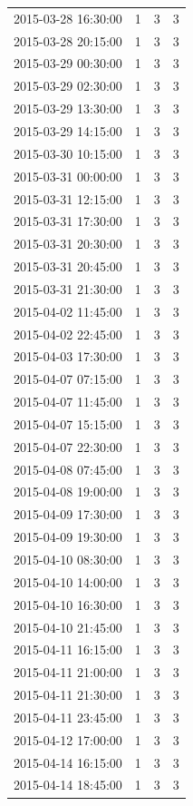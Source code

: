 \begin{tabular}{lrrr}
2015-03-28 16:30:00 & 1 & 3 & 3 \\
2015-03-28 20:15:00 & 1 & 3 & 3 \\
2015-03-29 00:30:00 & 1 & 3 & 3 \\
2015-03-29 02:30:00 & 1 & 3 & 3 \\
2015-03-29 13:30:00 & 1 & 3 & 3 \\
2015-03-29 14:15:00 & 1 & 3 & 3 \\
2015-03-30 10:15:00 & 1 & 3 & 3 \\
2015-03-31 00:00:00 & 1 & 3 & 3 \\
2015-03-31 12:15:00 & 1 & 3 & 3 \\
2015-03-31 17:30:00 & 1 & 3 & 3 \\
2015-03-31 20:30:00 & 1 & 3 & 3 \\
2015-03-31 20:45:00 & 1 & 3 & 3 \\
2015-03-31 21:30:00 & 1 & 3 & 3 \\
2015-04-02 11:45:00 & 1 & 3 & 3 \\
2015-04-02 22:45:00 & 1 & 3 & 3 \\
2015-04-03 17:30:00 & 1 & 3 & 3 \\
2015-04-07 07:15:00 & 1 & 3 & 3 \\
2015-04-07 11:45:00 & 1 & 3 & 3 \\
2015-04-07 15:15:00 & 1 & 3 & 3 \\
2015-04-07 22:30:00 & 1 & 3 & 3 \\
2015-04-08 07:45:00 & 1 & 3 & 3 \\
2015-04-08 19:00:00 & 1 & 3 & 3 \\
2015-04-09 17:30:00 & 1 & 3 & 3 \\
2015-04-09 19:30:00 & 1 & 3 & 3 \\
2015-04-10 08:30:00 & 1 & 3 & 3 \\
2015-04-10 14:00:00 & 1 & 3 & 3 \\
2015-04-10 16:30:00 & 1 & 3 & 3 \\
2015-04-10 21:45:00 & 1 & 3 & 3 \\
2015-04-11 16:15:00 & 1 & 3 & 3 \\
2015-04-11 21:00:00 & 1 & 3 & 3 \\
2015-04-11 21:30:00 & 1 & 3 & 3 \\
2015-04-11 23:45:00 & 1 & 3 & 3 \\
2015-04-12 17:00:00 & 1 & 3 & 3 \\
2015-04-14 16:15:00 & 1 & 3 & 3 \\
2015-04-14 18:45:00 & 1 & 3 & 3 \\

\end{tabular}
